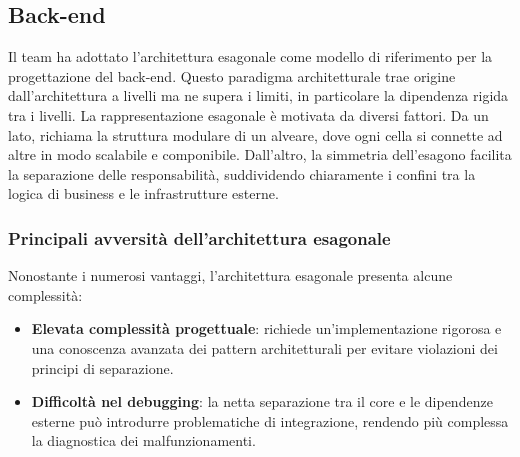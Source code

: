 \subsection{Back-end}
\label{subsec:architettura_backend}

Il team ha adottato l'architettura esagonale come modello di riferimento per la progettazione del back-end. 
Questo paradigma architetturale trae origine dall'architettura a livelli ma ne supera i limiti, in particolare la dipendenza rigida tra i livelli.
La rappresentazione esagonale è motivata da diversi fattori. 
Da un lato, richiama la struttura modulare di un alveare, dove ogni cella si connette ad altre in modo scalabile e componibile. 
Dall'altro, la simmetria dell'esagono facilita la separazione delle responsabilità, suddividendo chiaramente i confini tra la logica di business e le infrastrutture esterne.

\subsubsection{Principali avversità dell'architettura esagonale}
Nonostante i numerosi vantaggi, l'architettura esagonale presenta alcune complessità:
\begin{itemize}
    \item \textbf{Elevata complessità progettuale}: richiede un'implementazione rigorosa e una conoscenza avanzata dei pattern architetturali per evitare violazioni dei principi di separazione.
    \item \textbf{Difficoltà nel debugging}: la netta separazione tra il core e le dipendenze esterne può introdurre problematiche di integrazione, rendendo più complessa la diagnostica dei malfunzionamenti.
\end{itemize}

